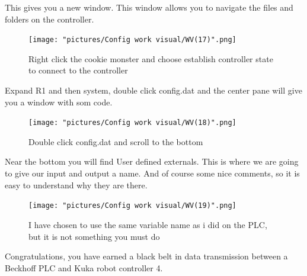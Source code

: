 \documentclass{article}
\begin{document}
This gives you a new window. This window allows you to navigate the files and folders on the controller. 

\begin{figure}[!h]
    \centering
    \texttt{[image: "pictures/Config work visual/WV(17)".png]}
    \caption{Right click the cookie monster and choose establish controller state to connect to the controller}
   
\end{figure}

\newpage

Expand R1 and then system, double click config.dat and the center pane will give you a window with som code.

\begin{figure}[!h]
    \centering
    \texttt{[image: "pictures/Config work visual/WV(18)".png]}
    \caption{Double click config.dat and scroll to the bottom}
    
\end{figure}

Near the bottom you will find User defined externals. This is where we are going to give our input and output a name. And of course some nice comments, so it is easy to understand why they are there. 

\newpage

\begin{figure}[!h]
    \centering
    \texttt{[image: "pictures/Config work visual/WV(19)".png]}
    \caption{I have chosen to use the same variable name as i did on the PLC, but it is not something you must do}
    
\end{figure}

Congratulations, you have earned a black belt in data transmission between a Beckhoff PLC and Kuka robot controller 4.  
\end{document}
